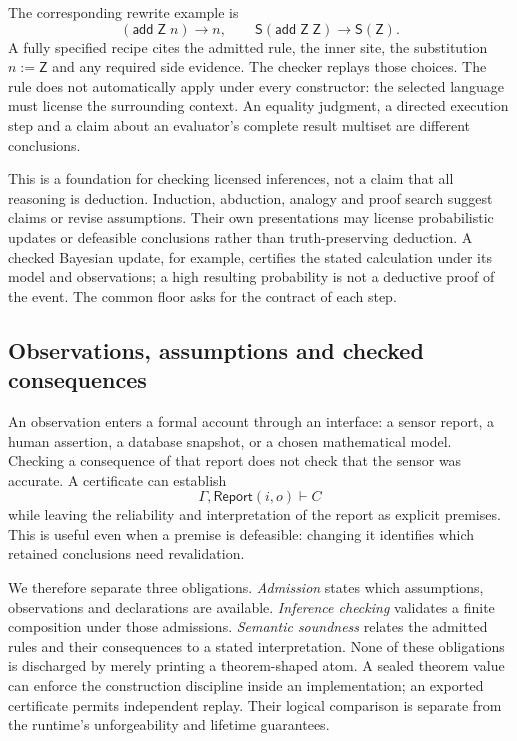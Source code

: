 \documentclass[11pt,a4paper]{article}
\theoremstyle{plain}
\theoremstyle{definition}
\theoremstyle{remark}
\begin{document}
The corresponding rewrite example is
\[
  (\mathsf{add}\;\mathsf{Z}\;n)\longrightarrow n,
  \qquad
  \mathsf{S}(\mathsf{add}\;\mathsf{Z}\;\mathsf{Z})
        \longrightarrow\mathsf{S}(\mathsf{Z}).
\]
A fully specified recipe cites the admitted rule, the inner site, the
substitution $n:=\mathsf{Z}$ and any required side evidence. The checker
replays those choices. The rule does not automatically apply under every
constructor: the selected language must license the surrounding context.
An equality judgment, a directed execution step and a claim about an evaluator's
complete result multiset are different conclusions.

This is a foundation for checking licensed inferences, not a claim that all
reasoning is deduction. Induction, abduction, analogy and proof search suggest
claims or revise assumptions. Their own presentations may license probabilistic
updates or defeasible conclusions rather than truth-preserving deduction.
A checked Bayesian update, for example, certifies the stated calculation under
its model and observations; a high resulting probability is not a deductive
proof of the event. The common floor asks for the contract of each step.

\subsection{Observations, assumptions and checked consequences}

An observation enters a formal account through an interface: a sensor report,
a human assertion, a database snapshot, or a chosen mathematical model.
Checking a consequence of that report does not check that the sensor was
accurate. A certificate can establish
\[
  \Gamma,\mathsf{Report}(i,o)\vdash C
\]
while leaving the reliability and interpretation of the report as explicit
premises. This is useful even when a premise is defeasible: changing it
identifies which retained conclusions need revalidation.

We therefore separate three obligations. \emph{Admission} states which
assumptions, observations and declarations are available. \emph{Inference
checking} validates a finite composition under those admissions.
\emph{Semantic soundness} relates the admitted rules and their consequences to
a stated interpretation. None of these obligations is discharged by merely
printing a theorem-shaped atom. A sealed theorem value can enforce the
construction discipline inside an implementation; an exported certificate
permits independent replay. Their logical comparison is separate from the
runtime's unforgeability and lifetime guarantees.
\end{document}
